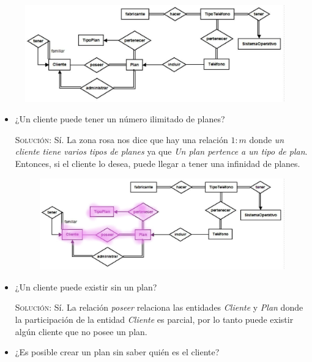 \documentclass[letterpaper,11pt]{article}
\begin{document}
\begin{figure}[h]
    \centering
    \includegraphics[scale=0.4]{./imagenes/modelo.jpg}
\end{figure}

\begin{itemize}
    \item ¿Un cliente puede tener un número ilimitado de planes?

    \textsc{Solución:} Sí. La zona rosa nos dice que hay una relación $1:m$ 
    donde \textit{un cliente tiene varios tipos de planes} ya que 
    \textit{Un plan pertence a un tipo de plan}. Entonces, si el 
    cliente lo desea, puede llegar a tener una infinidad de planes.

    \begin{figure}[h]
        \centering
        \includegraphics[scale=0.4]{./imagenes/modelo1.jpg}
    \end{figure}

    \item ¿Un cliente puede existir sin un plan?

    \textsc{Solución:} Sí. La relación \textit{poseer} relaciona las entidades \textit{Cliente} y \textit{Plan} donde la participación de la entidad \textit{Cliente} es parcial, por lo tanto puede existir algún cliente que no posee un plan.

    \item ¿Es posible crear un plan sin saber quién es el cliente?
    

\end{itemize}
\end{document}
